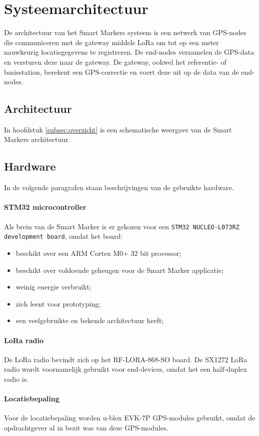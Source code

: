\section{Systeemarchitectuur}
De architectuur van het Smart Markers systeem is een netwerk van GPS-nodes die communiceren met de gateway middels LoRa om tot op een meter nauwkeurig locatiegegevens te registreren. De end-nodes verzamelen de GPS-data en versturen deze naar de gateway. De gateway, ookwel het referentie- of basisstation, berekent een GPS-correctie en voert deze uit op de data van de end-nodes.

\subsection{Architectuur}
In hoofdstuk \ref{subsec:overzicht} is een schematische weergave van de Smart Markers architectuur.

\subsection{Hardware}
In de volgende paragrafen staan beschrijvingen van de gebruikte hardware.
\paragraph{STM32 microcontroller}
Als brein van de Smart Marker is er gekozen voor een \texttt{STM32 NUCLEO-L073RZ development board}, omdat het board:
\begin{itemize}
    \item beschikt over een ARM Cortex M0+ 32 bit processor;
    \item beschikt over voldoende geheugen voor de Smart Marker applicatie;
    \item weinig energie verbruikt;
    \item zich leent voor prototyping;
    \item een veelgebruikte en bekende architectuur heeft;
\end{itemize}

\paragraph{LoRa radio}
De LoRa radio bevindt zich op het RF-LORA-868-SO board. De SX1272 LoRa radio wordt voornamelijk gebruikt voor end-devices, omdat het een half-duplex radio is.

\paragraph{Locatiebepaling}
Voor de locatiebepaling worden u-blox EVK-7P GPS-modules gebruikt, omdat de opdrachtgever al in bezit was van deze GPS-modules.

